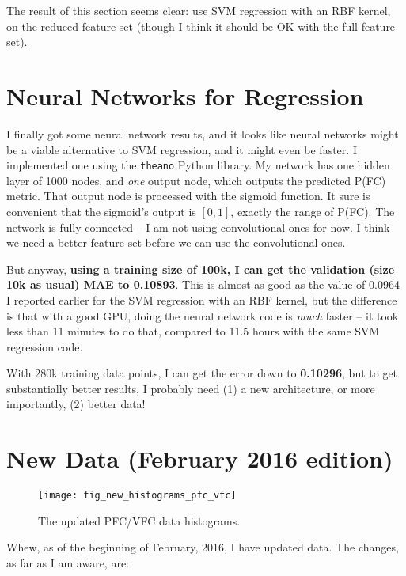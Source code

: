 \documentclass[a4paper, 11pt]{article}
\begin{document}
The result of this section seems clear: use SVM regression with an RBF kernel, on the reduced
feature set (though I think it should be OK with the full feature set).




\section{Neural Networks for Regression}

I finally got some neural network results, and it looks like neural networks might be a viable
alternative to SVM regression, and it might even be faster. I implemented one using the
\texttt{theano} Python library. My network has one hidden layer of 1000 nodes, and \emph{one} output
node, which outputs the predicted P(FC) metric. That output node is processed with the sigmoid
function. It sure is convenient that the sigmoid's output is $[0,1]$, exactly the range of P(FC).
The network is fully connected -- I am not using convolutional ones for now. I think we need a
better feature set before we can use the convolutional ones.

But anyway, \textbf{using a training size of 100k, I can get the validation (size 10k as usual) MAE
to 0.10893}. This is almost as good as the value of 0.0964 I reported earlier for the SVM regression
with an RBF kernel, but the difference is that with a good GPU, doing the neural network code is
\emph{much} faster -- it took less than 11 minutes to do that, compared to 11.5 hours with the same
SVM regression code.

With 280k training data points, I can get the error down to \textbf{0.10296}, but to get
substantially better results, I probably need (1) a new architecture, or more importantly, (2)
better data!





\section{New Data (February 2016 edition)}

\begin{figure}[t]
  \centering
  \texttt{[image: fig\_new\_histograms\_pfc\_vfc]}
  \caption{The updated PFC/VFC data histograms.}
  \label{fig:updated_pfc_vfc}
\end{figure}

Whew, as of the beginning of February, 2016, I have updated data. The changes, as far as I am aware,
are:
\end{document}
